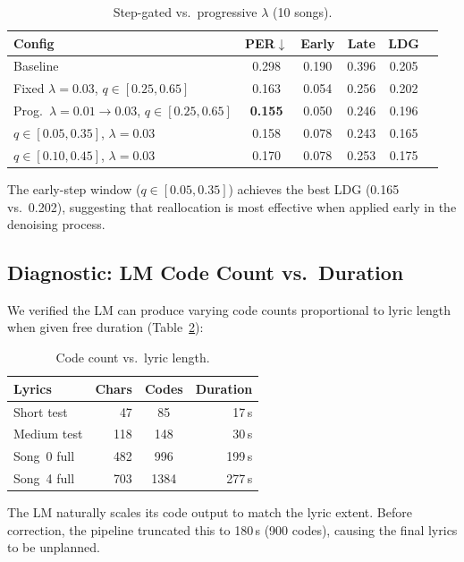 \documentclass[11pt,a4paper]{article}
\newcommand{\per}{PER}
\begin{document}
\begin{table}[h]
\centering
\caption{Step-gated vs.\ progressive $\lambda$ (10 songs).}
\label{tab:stepgate}
\begin{tabular}{lccccc}
\toprule
Config & \per$\downarrow$ & Early & Late & LDG \\
\midrule
Baseline & 0.298 & 0.190 & 0.396 & 0.205 \\
Fixed $\lambda=0.03$, $q\in[0.25,0.65]$ & 0.163 & 0.054 & 0.256 & 0.202 \\
Prog.\ $\lambda=0.01\to0.03$, $q\in[0.25,0.65]$ & \textbf{0.155} & 0.050 & 0.246 & 0.196 \\
$q\in[0.05,0.35]$, $\lambda=0.03$ & 0.158 & 0.078 & 0.243 & 0.165 \\
$q\in[0.10,0.45]$, $\lambda=0.03$ & 0.170 & 0.078 & 0.253 & 0.175 \\
\bottomrule
\end{tabular}
\end{table}

The early-step window ($q\in[0.05,0.35]$) achieves the best LDG (0.165 vs.\ 0.202), suggesting that reallocation is most effective when applied early in the denoising process.

\subsection{Diagnostic: LM Code Count vs.\ Duration}

We verified the LM can produce varying code counts proportional to lyric length when given free duration (Table~\ref{tab:codes}):

\begin{table}[h]
\centering
\caption{Code count vs.\ lyric length.}
\label{tab:codes}
\begin{tabular}{lrcr}
\toprule
Lyrics & Chars & Codes & Duration \\
\midrule
Short test & 47 & 85 & 17\,s \\
Medium test & 118 & 148 & 30\,s \\
Song~0 full & 482 & 996 & 199\,s \\
Song~4 full & 703 & 1384 & 277\,s \\
\bottomrule
\end{tabular}
\end{table}

The LM naturally scales its code output to match the lyric extent. Before correction, the pipeline truncated this to 180\,s (900 codes), causing the final lyrics to be unplanned.
\end{document}
